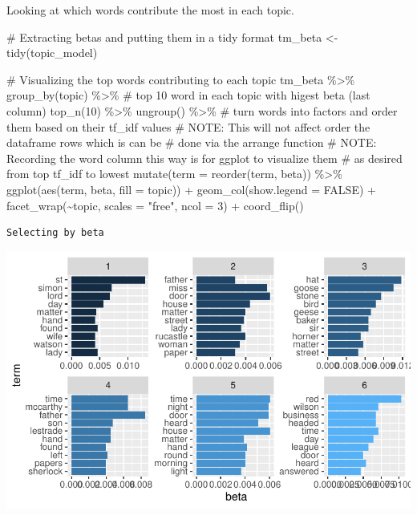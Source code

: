 \documentclass[
  letterpaper,
  DIV=11,
  numbers=noendperiod]{scrreprt}
\newenvironment{Shaded}{\begin{snugshade}}{\end{snugshade}}
\newcommand{\AlertTok}[1]{\textcolor[rgb]{0.68,0.00,0.00}{#1}}
\newcommand{\AttributeTok}[1]{\textcolor[rgb]{0.40,0.45,0.13}{#1}}
\newcommand{\CommentTok}[1]{\textcolor[rgb]{0.37,0.37,0.37}{#1}}
\newcommand{\ConstantTok}[1]{\textcolor[rgb]{0.56,0.35,0.01}{#1}}
\newcommand{\DecValTok}[1]{\textcolor[rgb]{0.68,0.00,0.00}{#1}}
\newcommand{\FunctionTok}[1]{\textcolor[rgb]{0.28,0.35,0.67}{#1}}
\newcommand{\NormalTok}[1]{\textcolor[rgb]{0.00,0.23,0.31}{#1}}
\newcommand{\OtherTok}[1]{\textcolor[rgb]{0.00,0.23,0.31}{#1}}
\newcommand{\SpecialCharTok}[1]{\textcolor[rgb]{0.37,0.37,0.37}{#1}}
\newcommand{\StringTok}[1]{\textcolor[rgb]{0.13,0.47,0.30}{#1}}
\begin{document}
Looking at which words contribute the most in each topic.

\begin{Shaded}
\begin{Highlighting}[]
\CommentTok{\# Extracting betas and putting them in a tidy format}
\NormalTok{tm\_beta }\OtherTok{\textless{}{-}} \FunctionTok{tidy}\NormalTok{(topic\_model)}

\CommentTok{\# Visualizing the top words contributing to each topic}
\NormalTok{tm\_beta }\SpecialCharTok{\%\textgreater{}\%} 
  \FunctionTok{group\_by}\NormalTok{(topic) }\SpecialCharTok{\%\textgreater{}\%} 
  \CommentTok{\# top 10 word in each topic with higest beta (last column)}
  \FunctionTok{top\_n}\NormalTok{(}\DecValTok{10}\NormalTok{) }\SpecialCharTok{\%\textgreater{}\%} 
  \FunctionTok{ungroup}\NormalTok{() }\SpecialCharTok{\%\textgreater{}\%} 
  \CommentTok{\# turn words into factors and order them based on their tf\_idf values}
  \CommentTok{\# }\AlertTok{NOTE}\CommentTok{: This will not affect order the dataframe rows which is can be}
  \CommentTok{\#   done via the arrange function}
  \CommentTok{\# }\AlertTok{NOTE}\CommentTok{: Recording the word column this way is for ggplot to visualize them}
  \CommentTok{\#   as desired from top tf\_idf to lowest}
  \FunctionTok{mutate}\NormalTok{(}\AttributeTok{term =} \FunctionTok{reorder}\NormalTok{(term, beta)) }\SpecialCharTok{\%\textgreater{}\%} 
  \FunctionTok{ggplot}\NormalTok{(}\FunctionTok{aes}\NormalTok{(term, beta, }\AttributeTok{fill =}\NormalTok{ topic)) }\SpecialCharTok{+}
  \FunctionTok{geom\_col}\NormalTok{(}\AttributeTok{show.legend =} \ConstantTok{FALSE}\NormalTok{) }\SpecialCharTok{+}
  \FunctionTok{facet\_wrap}\NormalTok{(}\SpecialCharTok{\textasciitilde{}}\NormalTok{topic, }\AttributeTok{scales =} \StringTok{"free"}\NormalTok{, }\AttributeTok{ncol =} \DecValTok{3}\NormalTok{) }\SpecialCharTok{+}
  \FunctionTok{coord\_flip}\NormalTok{()}
\end{Highlighting}
\end{Shaded}

\begin{verbatim}
Selecting by beta
\end{verbatim}

\includegraphics{src/practice/topic-modeling-r_files/figure-pdf/unnamed-chunk-7-1.pdf}
\end{document}
